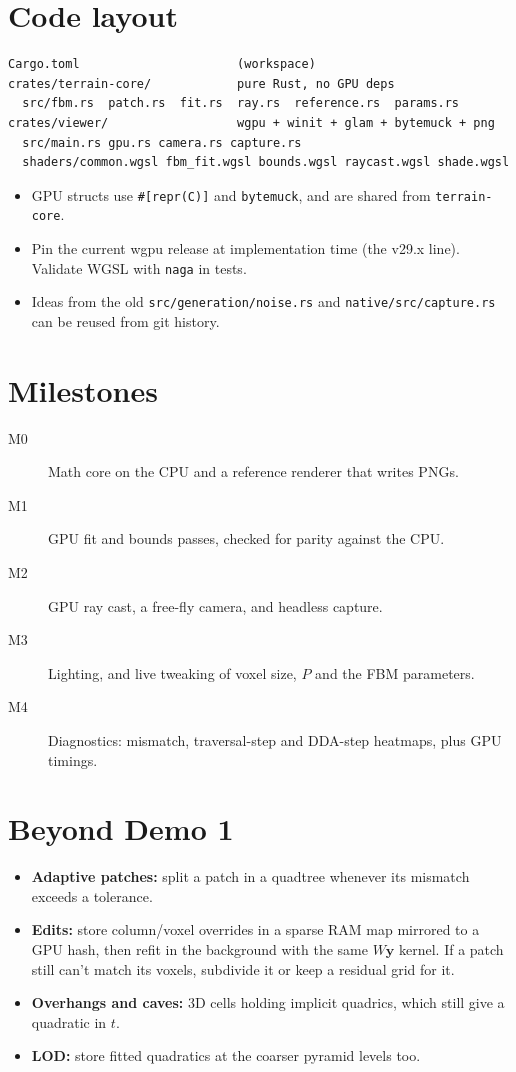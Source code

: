 \documentclass[11pt]{article}
\begin{document}
\section{Code layout}
\begin{lstlisting}
Cargo.toml                      (workspace)
crates/terrain-core/            pure Rust, no GPU deps
  src/fbm.rs  patch.rs  fit.rs  ray.rs  reference.rs  params.rs
crates/viewer/                  wgpu + winit + glam + bytemuck + png
  src/main.rs gpu.rs camera.rs capture.rs
  shaders/common.wgsl fbm_fit.wgsl bounds.wgsl raycast.wgsl shade.wgsl
\end{lstlisting}
\begin{itemize}
\item GPU structs use \texttt{\#[repr(C)]} and \texttt{bytemuck}, and are shared from \texttt{terrain-core}.
\item Pin the current wgpu release at implementation time (the v29.x line). Validate WGSL with \texttt{naga} in tests.
\item Ideas from the old \texttt{src/generation/noise.rs} and \texttt{native/src/capture.rs} can be reused from git history.
\end{itemize}

\section{Milestones}
\begin{description}
\item[M0] Math core on the CPU and a reference renderer that writes PNGs.
\item[M1] GPU fit and bounds passes, checked for parity against the CPU.
\item[M2] GPU ray cast, a free-fly camera, and headless capture.
\item[M3] Lighting, and live tweaking of voxel size, $P$ and the FBM parameters.
\item[M4] Diagnostics: mismatch, traversal-step and DDA-step heatmaps, plus GPU timings.
\end{description}

\section{Beyond Demo 1}
\begin{itemize}
\item \textbf{Adaptive patches:} split a patch in a quadtree whenever its mismatch exceeds a tolerance.
\item \textbf{Edits:} store column/voxel overrides in a sparse RAM map mirrored to a GPU hash, then refit in the background with the same $W\mathbf y$ kernel. If a patch still can't match its voxels, subdivide it or keep a residual grid for it.
\item \textbf{Overhangs and caves:} 3D cells holding implicit quadrics, which still give a quadratic in $t$.
\item \textbf{LOD:} store fitted quadratics at the coarser pyramid levels too.
\end{itemize}
\end{document}
